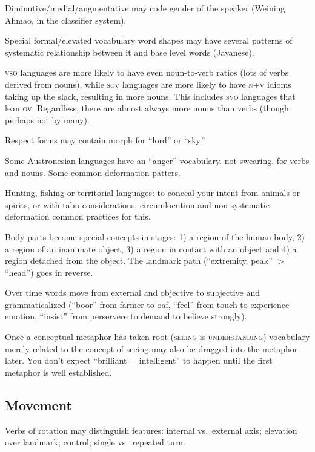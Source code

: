 \documentclass[11pt]{article}
\newcommand{\I}[1]{\textsc{#1}}   %
\begin{document}
Diminutive/medial/augmentative may code gender of the speaker (Weining
Ahmao, in the classifier system).

Special formal/elevated vocabulary word shapes may have several
patterns of systematic relationship between it and base level words
(Javanese).

\I{vso} languages are more likely to have even noun-to-verb ratios
(lots of verbs derived from nouns), while \I{sov} languages are more
likely to have \I{n+v} idioms taking up the slack, resulting in more
nouns.  This includes \I{svo} languages that lean \I{ov}.  Regardless,
there are almost always more nouns than verbs (though perhaps not by
many).

Respect forms may contain morph for ``lord'' or ``sky.''

Some Austronesian languages have an ``anger'' vocabulary, not
swearing, for verbs and nouns.  Some common deformation patters.

Hunting, fishing or territorial languages: to conceal your intent from
animals or spirits, or with tabu considerations; circumlocution and
non-systematic deformation common practices for this.

Body parts become special concepts in stages: 1) a region of the human
body, 2) a region of an inanimate object, 3) a region in contact with
an object and 4) a region detached from the object.  The landmark path
(``extremity, peak'' $>$ ``head'') goes in reverse.

Over time words move from external and objective to subjective and
grammaticalized (``boor'' from farmer to oaf, ``feel'' from touch to
experience emotion, ``insist'' from perservere to demand to believe
strongly).

Once a conceptual metaphor has taken root (\I{seeing} is
\I{understanding}) vocabulary merely related to the concept of seeing
may also be dragged into the metaphor later.  You don't expect
``brilliant = intelligent'' to happen until the first metaphor is well
established.

\subsection{Movement}
Verbs of rotation may distinguish features: internal vs.\ external
axis; elevation over landmark; control; single vs.\ repeated turn.
\end{document}
